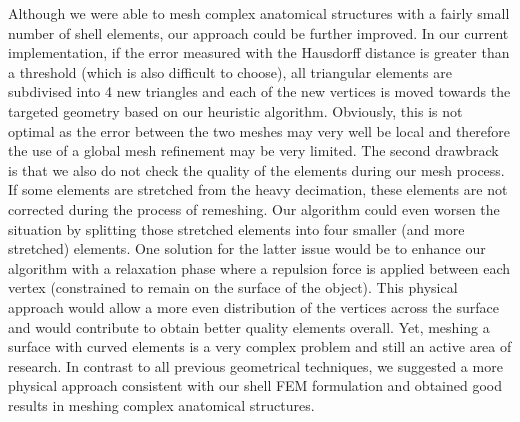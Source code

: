 Although we were able to mesh complex anatomical structures with a fairly small number of shell elements, our approach could be further improved. In our current implementation, if the error measured with the Hausdorff distance is greater than a threshold (which is also difficult to choose), all triangular elements are subdivised into 4 new triangles and each of the new vertices is moved towards the targeted geometry based on our heuristic algorithm. Obviously, this is not optimal as the error between the two meshes may very well be local and therefore the use of a global mesh refinement may be very limited. The second drawbrack is that we also do not check the quality of the elements during our mesh process. If some elements are stretched from the heavy decimation, these elements are not corrected during the process of remeshing. Our algorithm could even worsen the situation by splitting those stretched elements into four smaller (and more stretched) elements. One solution for the latter issue would be to enhance our algorithm with a relaxation phase where a repulsion force is applied between each vertex (constrained to remain on the surface of the object). This physical approach would allow a more even distribution of the vertices across the surface and would contribute to obtain better quality elements overall. Yet, meshing a surface with curved elements is a very complex problem and still an active area of research. In contrast to all previous geometrical techniques, we suggested a more physical approach consistent with our shell FEM formulation and obtained good results in meshing complex anatomical structures. 
